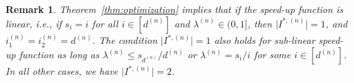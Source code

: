 \documentclass[a4paper]{article}
\theoremstyle{plain}
\newtheorem{cor}{Corollary}
\newtheorem{remark}{Remark}
\theoremstyle{definition}
\theoremstyle{case}
\theoremstyle{remark}
\newcommand{\abs}[1]{\lvert #1 \rvert}
\begin{document}

\begin{remark}
\label{rem:linear}
    Theorem~\ref{thm:optimization} implies that if the speed-up function is linear, i.e., if $s_i=i$ for all $i\in [d^{(n)}]$ and $\lambda^{(n)}\in (0,1]$, then $\abs{I^{*,(n)}}=1$, and $i_1^{(n)}=i_2^{(n)}=d^{(n)}$. The condition $\abs{I^{*,(n)}}=1$ also holds for sub-linear speed-up function as long as $\lambda ^{(n)} \leq s_{d^{(n)}}/d^{(n)}$ or $\lambda^{(n)} = s_i/i$ for some $i \in [d^{(n)}]$. In all other cases, we have $\abs{I^{*,(n)}}=2$. 
\end{remark}



\end{document}
